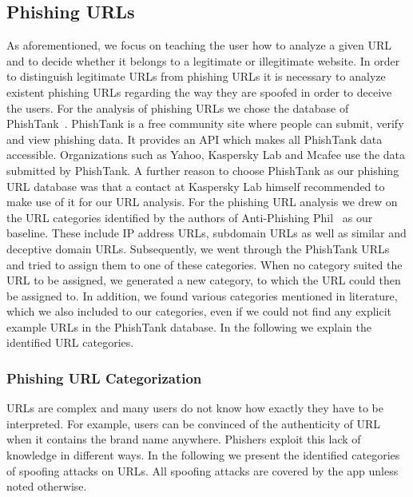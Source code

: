 \subsection{Phishing URLs}
As aforementioned, we focus on teaching the user how to analyze a given URL and to decide whether it belongs to a legitimate or illegitimate website.
 In order to distinguish legitimate URLs from phishing URLs it is necessary to analyze existent phishing URLs regarding the way they are spoofed in order to deceive the users.
 For the analysis of phishing URLs we chose the database of PhishTank~\cite{phishtank}.
PhishTank is a free community site where people can submit, verify and view phishing data.
 It provides an API which makes all PhishTank data accessible.
 Organizations such as Yahoo, Kaspersky Lab and Mcafee use the data submitted by PhishTank. A further reason to choose PhishTank as our phishing URL database was that a contact at Kaspersky Lab himself recommended to make use of it for our URL analysis.
 For the phishing URL analysis we drew on the URL categories identified by the authors of Anti-Phishing Phil~\cite{sheng2007antiphishingphil} as our baseline.
 These include IP address URLs, subdomain URLs as well as similar and deceptive domain URLs.
 Subsequently, we went through the PhishTank URLs and tried to assign them to one of these categories.
 When no category suited the URL to be assigned, we generated a new category, to which the URL could then be assigned to.
 In addition, we found various categories mentioned in literature, which we also included to our categories, even if we could not find any explicit example URLs in the PhishTank database.
 In the following we explain the identified URL categories.
\subsubsection{Phishing URL Categorization}
\label{s:url_categories}
URLs are complex and many users do not know how exactly they have to be interpreted.
 For example, users can be convinced of the authenticity of URL when it contains the brand name anywhere.
 Phishers exploit this lack of knowledge in different ways.
 In the following we present the identified categories of spoofing attacks on URLs. 
 All spoofing attacks are covered by the app unless noted otherwise.

